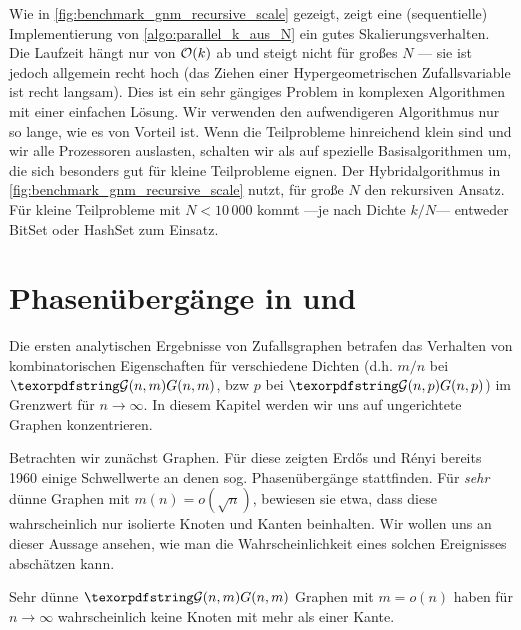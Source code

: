 Wie in \cref{fig:benchmark_gnm_recursive_scale} gezeigt, zeigt eine (sequentielle) Implementierung von \cref{algo:parallel_k_aus_N} ein gutes Skalierungsverhalten.
Die Laufzeit hängt nur von $\mathcal{O}\!\left(k\right)$ ab und steigt nicht für großes $N$ --- sie ist jedoch allgemein recht hoch (das Ziehen einer Hypergeometrischen Zufallsvariable ist recht langsam).
Dies  ist ein sehr gängiges Problem in komplexen Algorithmen mit einer einfachen Lösung.
Wir verwenden den aufwendigeren Algorithmus nur so lange, wie es von Vorteil ist.
Wenn die Teilprobleme hinreichend klein sind und wir alle Prozessoren auslasten, schalten wir als  auf spezielle Basisalgorithmen um, die sich besonders gut für kleine Teilprobleme eignen.
Der Hybridalgorithmus in \cref{fig:benchmark_gnm_recursive_scale} nutzt, für große $N$ den rekursiven Ansatz.
Für kleine Teilprobleme mit $N < 10\,000$ kommt  ---je nach Dichte $k/N$--- entweder BitSet oder HashSet zum Einsatz.

\section{Phasenübergänge in \Gnp und \Gnm}
Die ersten analytischen Ergebnisse von Zufallsgraphen betrafen das Verhalten von kombinatorischen Eigenschaften für verschiedene Dichten (d.h. $m/n$ bei $\Gnm$, bzw $p$ bei $\Gnp$) im Grenzwert für $n \to \infty$.
In  diesem Kapitel werden wir uns auf ungerichtete Graphen konzentrieren.

Betrachten wir zunächst \Gnm Graphen.
Für diese zeigten Erd\H{o}s und R\'enyi bereits 1960 einige Schwellwerte an denen sog. Phasenübergänge stattfinden.
Für \emph{sehr} dünne Graphen mit $m(n) = o(\sqrt n)$, bewiesen sie etwa, dass diese wahrscheinlich nur isolierte Knoten und Kanten beinhalten.
Wir wollen uns an dieser Aussage ansehen, wie man die Wahrscheinlichkeit eines solchen Ereignisses abschätzen kann.

\begin{lemma}
    Sehr dünne $\Gnm$ Graphen mit $m = o(n)$ haben für $n \to \infty$ wahrscheinlich keine Knoten mit mehr als einer Kante.
\end{lemma}

